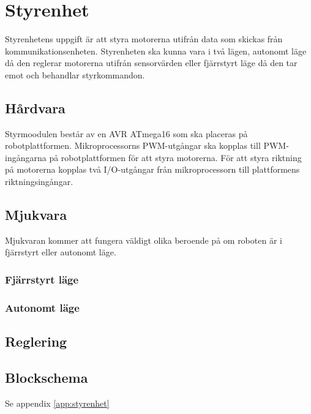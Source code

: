 \section{Styrenhet}
Styrenhetens uppgift är att styra motorerna utifrån data som skickas från kommunikationsenheten.
Styrenheten ska kunna vara i två lägen, autonomt läge då den reglerar motorerna utifrån sensorvärden eller 
fjärrstyrt läge då den tar emot och behandlar styrkommandon.
\subsection{Hårdvara}
Styrmoodulen består av en AVR ATmega16 som ska placeras på robotplattformen.
Mikroprocessorns PWM-utgångar ska kopplas till PWM-ingångarna på robotplattformen för att styra motorerna.
För att styra riktning på motorerna kopplas två I/O-utgångar från mikroprocessorn till plattformens riktningsingångar.
\subsection{Mjukvara}
Mjukvaran kommer att fungera väldigt olika beroende på om roboten är i fjärrstyrt eller autonomt läge.
\subsubsection{Fjärrstyrt läge}

\subsubsection{Autonomt läge}
\subsection{Reglering}
\subsection{Blockschema}
Se appendix \ref{app:styrenhet}
